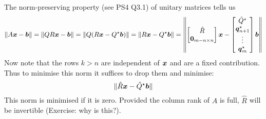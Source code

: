 \begin{example}
The norm-preserving property (see PS4 Q3.1) of unitary matrices tells us
\[
\| A \bm{{\mbox{\boldmath$x$\unboldmath}}} - \bm{{\mbox{\boldmath$b$\unboldmath}}} \| = \| Q R \bm{{\mbox{\boldmath$x$\unboldmath}}} - \bm{{\mbox{\boldmath$b$\unboldmath}}} \| = \| Q (R \bm{{\mbox{\boldmath$x$\unboldmath}}} - Q^\star \bm{{\mbox{\boldmath$b$\unboldmath}}}) \| = \| R \bm{{\mbox{\boldmath$x$\unboldmath}}} - Q^\star \bm{{\mbox{\boldmath$b$\unboldmath}}} \| = \left \| 
\begin{bmatrix} \hat R \\ \bm{{\mbox{\boldmath$0$\unboldmath}}}_{m-n \times n} \end{bmatrix} \bm{{\mbox{\boldmath$x$\unboldmath}}} - \begin{bmatrix} \hat Q^\star \\ \bm{{\mbox{\boldmath$q$\unboldmath}}}_{n+1}^\star \\ \vdots \\ \bm{{\mbox{\boldmath$q$\unboldmath}}}_m^\star \end{bmatrix}     \bm{{\mbox{\boldmath$b$\unboldmath}}} \right \|
\]
Now note that the rows $k > n$ are independent of $\bm{{\mbox{\boldmath$x$\unboldmath}}}$ and are a fixed contribution. Thus to minimise this norm it suffices to drop them and minimise:
\[
\| \hat R \bm{{\mbox{\boldmath$x$\unboldmath}}} - \hat Q^\star \bm{{\mbox{\boldmath$b$\unboldmath}}} \|
\]
This norm is minimised if it is zero. Provided the column rank of $A$ is full, $\hat R$ will be invertible (Exercise: why is this?).

\end{example}



